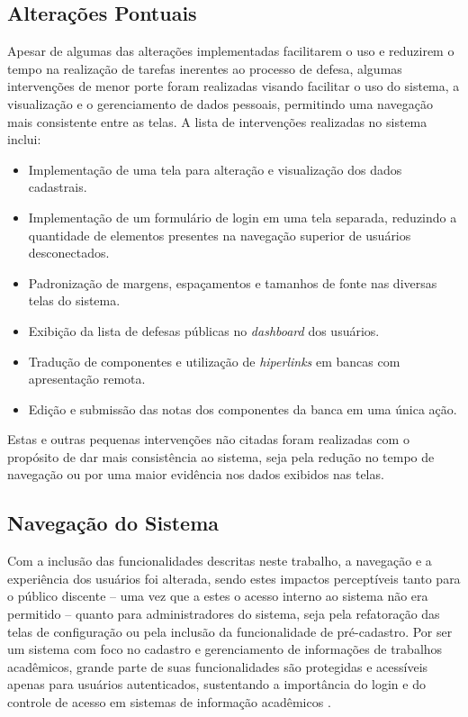 \documentclass[nonacm, sigconf]{acmart}
\begin{document}
\subsection{Alterações Pontuais}
\label{section:user-management-development}

Apesar de algumas das alterações implementadas facilitarem o uso e reduzirem o tempo na realização de tarefas inerentes ao processo de defesa, algumas intervenções de menor porte foram realizadas visando facilitar o uso do sistema, a visualização e o gerenciamento de dados pessoais, permitindo uma navegação mais consistente entre as telas. A lista de intervenções realizadas no sistema inclui:

\begin{itemize}
    \item Implementação de uma tela para alteração e visualização dos dados cadastrais.
    \item Implementação de um formulário de login em uma tela separada, reduzindo a quantidade de elementos presentes na navegação superior de usuários desconectados.
    \item Padronização de margens, espaçamentos e tamanhos de fonte nas diversas telas do sistema.
    \item Exibição da lista de defesas públicas no \textit{dashboard} dos usuários.
    \item Tradução de componentes e utilização de \textit{hiperlinks} em bancas com apresentação remota.
    \item Edição e submissão das notas dos componentes da banca em uma única ação.
\end{itemize}

Estas e outras pequenas intervenções não citadas foram realizadas com o propósito de dar mais consistência ao sistema, seja pela redução no tempo de navegação ou por uma maior evidência nos dados exibidos nas telas. 

\subsection{Navegação do Sistema}
\label{section:system-navigation}

Com a inclusão das funcionalidades descritas neste trabalho, a navegação e a experiência dos usuários foi alterada, sendo estes impactos perceptíveis tanto para o público discente -- uma vez que a estes o acesso interno ao sistema não era permitido -- quanto para administradores do sistema, seja pela refatoração das telas de configuração ou pela inclusão da funcionalidade de pré-cadastro. Por ser um sistema com foco no cadastro e gerenciamento de informações de trabalhos acadêmicos, grande parte de suas funcionalidades são protegidas e acessíveis apenas para usuários autenticados, sustentando a importância do login e do controle de acesso em sistemas de informação acadêmicos \cite{wu2020}.
\end{document}
